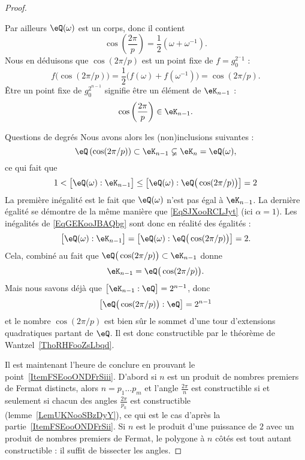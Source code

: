 \begin{proof}
\begin{subproof}
\begin{subproof}
			Par ailleurs \( \eQ(\omega)\) est un corps, donc il contient
			\begin{equation}
				\cos\left( \frac{ 2\pi }{ p } \right)=\frac{ 1 }{2}(\omega+\omega^{-1}).
			\end{equation}
			Nous en déduisons que \( \cos(2\pi/p)\) est un point fixe de \( f=g_0^{2^-1}\) :
			\begin{equation}
				f\big( \cos(2\pi/p) \big)=\frac{ 1 }{2}\big( f(\omega)+f(\omega^{-1}) \big)=\cos(2\pi/p).
			\end{equation}
			Être un point fixe de \( g_0^{2^{n-1}}\) signifie être un élément de \( \eK_{n-1}\) :
			\begin{equation}
				\cos\left( \frac{ 2\pi }{ p } \right)\in \eK_{n-1}.
			\end{equation}
			\item[Questions de degrés]
			Nous avons alors les (non)inclusions suivantes :
			\begin{equation}
				\eQ\left( \cos(2\pi/p) \right)\subset \eK_{n-1}\varsubsetneq \eK_n=\eQ(\omega),
			\end{equation}
			ce qui fait que
			\begin{equation}    \label{EqGEKooJBAQbg}
				1<\big[ \eQ(\omega):\eK_{n-1} \big]\leq\big[ \eQ(\omega):\eQ\big( \cos(2\pi/p) \big) \big]=2
			\end{equation}
			La première inégalité est le fait que \( \eQ(\omega)\) n'est pas égal à \( \eK_{n-1}\). La dernière égalité se démontre de la même manière que \eqref{EqSJXooRCLJyt} (ici \( \alpha=1\)). Les inégalités de \eqref{EqGEKooJBAQbg} sont donc en réalité des égalités :
			\begin{equation}
				\big[ \eQ(\omega):\eK_{n-1} \big]=\big[ \eQ(\omega):\eQ\big( \cos(2\pi/p) \big) \big]=2.
			\end{equation}
			Cela, combiné au fait que \( \eQ\big( \cos(2\pi/p) \big)\subset \eK_{n-1}\) donne
			\begin{equation}
				\eK_{n-1}=\eQ\big( \cos(2\pi/p) \big).
			\end{equation}
			Mais nous savons déjà que \( \big[ \eK_{n-1}:\eQ \big]=2^{n-1}\), donc
			\begin{equation}
				\big[ \eQ\big( \cos(2\pi/p) \big):\eQ \big]=2^{n-1}
			\end{equation}
			et le nombre \( \cos(2\pi/p)\) est bien sûr le sommet d'une tour d'extensions quadratiques partant de \( \eQ\). Il est donc constructible par le théorème de Wantzel~\ref{ThoRHFooZsLbqd}.
		\end{subproof}
	\end{subproof}
	Il est maintenant l'heure de conclure en prouvant le point~\ref{ItemFSEooONDFrSiii}. D'abord si \( n\) est un produit de nombres premiers de Fermat distincts, alors \( n=p_1\ldots p_m\) et l'angle \( \frac{ 2\pi }{ n }\) est constructible si et seulement si chacun des angles \( \frac{ 2\pi }{ p_k }\) est constructible (lemme~\ref{LemUKNooSBzDyY}), ce qui est le cas d'après la partie~\ref{ItemFSEooONDFrSii}. Si \( n\) est le produit d'une puissance de \( 2\) avec un produit de nombres premiers de Fermat, le polygone à \( n\) côtés est tout autant constructible : il suffit de bissecter les angles.


\end{proof}
